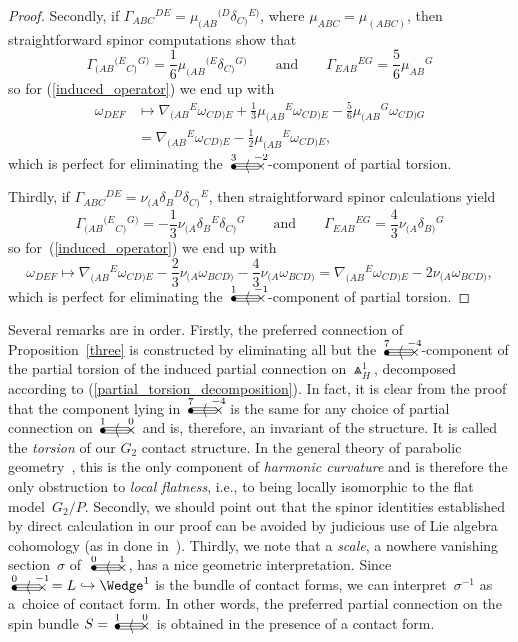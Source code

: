 \documentclass[pdftex]{sigma}%
\numberwithin{equation}{section}
\newcommand{\gtwo}[2]{\begin{picture}(28,10)
\put(4,1.1){\makebox(0,0){$\bullet$}}
\put(24,1.5){\makebox(0,0){$\times$}}
\put(4,3.5){\line(1,0){18}}
\put(4,1.5){\line(1,0){20}}
\put(4,-.5){\line(1,0){18}}
\put(14,1.5){\makebox(0,0){$\langle$}}
\put(4,8){\makebox(0,0){$\scriptstyle #1$}}
\put(24,8){\makebox(0,0){$\scriptstyle #2$}}
\end{picture}}
\begin{document}
\begin{proof}
Secondly, if $\Gamma_{ABC}{}^{DE}=\mu_{(AB}{}^{(D}\delta_{C)}{}^{E)}$, where
$\mu_{ABC}=\mu_{(ABC)}$, then straightforward spinor computations show that
\[\textstyle\Gamma_{(AB}{}^{(E}{}_{C)}{}^{G)}
=\frac16\mu_{(AB}{}^{(E}\delta_{C)}{}^{G)}\qquad\mbox{and}\qquad
\Gamma_{EAB}{}^{EG}=\frac56\mu_{AB}{}^G\]
so for (\ref{induced_operator}) we end up with
\begin{align*} \omega_{DEF}& \mapsto
\nabla_{(AB}{}^E\omega_{CD)E}
+\tfrac13\mu_{(AB}{}^E\omega_{CD)E}
-\tfrac56\mu_{(AB}{}^G\omega_{CD)G}\\
& =\nabla_{(AB}{}^E\omega_{CD)E}
-\tfrac12\mu_{(AB}{}^E\omega_{CD)E},\end{align*}
which is perfect for eliminating the $\gtwo{3}{-2}$-component of partial
torsion.

Thirdly, if $\Gamma_{ABC}{}^{DE}=\nu_{(A}\delta_B{}^D\delta_{C)}{}^E$, then
straightforward spinor calculations yield
\[\textstyle\Gamma_{(AB}{}^{(E}{}_{C)}{}^{G)}
=-\frac13\nu_{(A}\delta_B{}^E\delta_{C)}{}^G\qquad\mbox{and}\qquad
\Gamma_{EAB}{}^{EG}=\frac43\nu_{(A}\delta_{B)}{}^G\]
so for~(\ref{induced_operator}) we end up with
\[\textstyle\omega_{DEF}\mapsto\nabla_{(AB}{}^E\omega_{CD)E}
-\frac23\nu_{(A}\omega_{BCD)}
-\frac43\nu_{(A}\omega_{BCD)}
=\nabla_{(AB}{}^E\omega_{CD)E}
-2\nu_{(A}\omega_{BCD)},\]
which is perfect for eliminating the $\gtwo{1}{-1}$-component of partial
torsion.
\end{proof}

Several remarks are in order. Firstly, the preferred connection of
Proposition~\ref{three} is constructed by eliminating all but the
$\gtwo{7}{-4}$-component of the partial torsion of the induced partial
connection on $\Wedge_H^1$, decomposed according to
(\ref{partial_torsion_decomposition}). In fact, it is clear from the proof that
the component lying in $\gtwo{7}{-4}$ is the same for any choice of partial
connection on $\gtwo{1}{0}$ and is, therefore, an invariant of the structure.
It is called the {\em torsion} of our $G_2$ contact structure. In the general
theory of parabolic geometry~\cite{CS}, this is the only component of
{\em harmonic curvature} and is therefore the only obstruction to
{\em local flatness}, i.e., to being locally isomorphic to the flat
model~$G_2/P$. Secondly, we should point out that the spinor identities
established by direct calculation in our proof can be avoided by judicious use
of Lie algebra cohomology (as in done in~\cite{CS}). Thirdly, we note that a
{\em scale}, a nowhere vanishing section~$\sigma$ of~$\gtwo{0}{1}$, has a
nice geometric interpretation. Since $\gtwo{0}{-1}=L\hookrightarrow\Wedge^1$
is the bundle of contact forms, we can interpret~$\sigma^{-1}$ as a~choice of
contact form. In other words, the preferred partial connection on the spin
bundle $S=\gtwo{1}{0}$ is obtained in the presence of a contact form.
\end{document}

